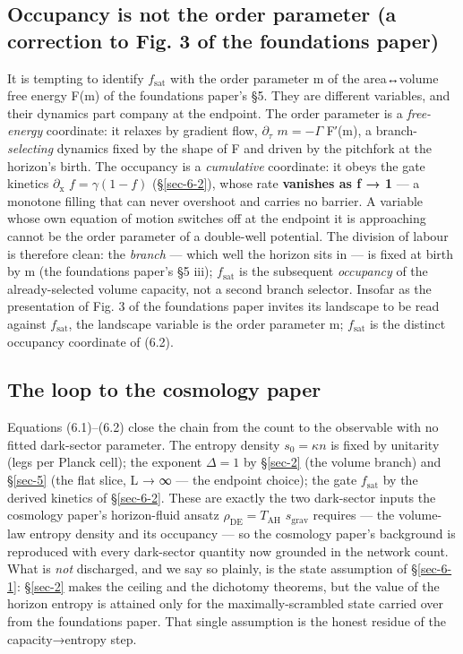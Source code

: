 \documentclass[12pt]{iopart}
\begin{document}
\subsection{Occupancy is not the order parameter (a correction to Fig. 3
of the foundations paper)}\label{sec-6-3}

It is tempting to identify \(f_{\mathrm{sat}}\) with the order parameter
m of the area↔volume free energy F(m) of the foundations paper's §5.
They are different variables, and their dynamics part company at the
endpoint. The order parameter is a \emph{free-energy} coordinate: it
relaxes by gradient flow, \(\partial _\tau\) \(m = -\Gamma\) F′(m), a
branch-\emph{selecting} dynamics fixed by the shape of F and driven by
the pitchfork at the horizon's birth. The occupancy is a
\emph{cumulative} coordinate: it obeys the gate kinetics
\(\partial _{\mathrm{x}}\) \(f = \gamma (1 - f)\) (§\ref{sec-6-2}),
whose rate \textbf{vanishes as f → 1} --- a monotone filling that can
never overshoot and carries no barrier. A variable whose own equation of
motion switches off at the endpoint it is approaching cannot be the
order parameter of a double-well potential. The division of labour is
therefore clean: the \emph{branch} --- which well the horizon sits in
--- is fixed at birth by m (the foundations paper's §5 iii);
\(f_{\mathrm{sat}}\) is the subsequent \emph{occupancy} of the
already-selected volume capacity, not a second branch selector. Insofar
as the presentation of Fig. 3 of the foundations paper invites its
landscape to be read against \(f_{\mathrm{sat}}\), the landscape
variable is the order parameter m; \(f_{\mathrm{sat}}\) is the distinct
occupancy coordinate of (6.2).

\subsection{The loop to the cosmology paper}\label{sec-6-4}

Equations (6.1)--(6.2) close the chain from the count to the observable
with no fitted dark-sector parameter. The entropy density
\(s_{0} = \kappa n\) is fixed by unitarity (legs per Planck cell); the
exponent \(\Delta  = 1\) by §\ref{sec-2} (the volume branch) and
§\ref{sec-5} (the flat slice, L → ∞ --- the endpoint choice); the gate
\(f_{\mathrm{sat}}\) by the derived kinetics of §\ref{sec-6-2}. These
are exactly the two dark-sector inputs the cosmology paper's
horizon-fluid ansatz \(\rho _\mathrm{DE} = T_\mathrm{AH}\)
\(s_{\mathrm{grav}}\) requires --- the volume-law entropy density and
its occupancy --- so the cosmology paper's background is reproduced with
every dark-sector quantity now grounded in the network count. What is
\emph{not} discharged, and we say so plainly, is the state assumption of
§\ref{sec-6-1}: §\ref{sec-2} makes the ceiling and the dichotomy
theorems, but the value of the horizon entropy is attained only for the
maximally-scrambled state carried over from the foundations paper. That
single assumption is the honest residue of the capacity→entropy step.
\end{document}

